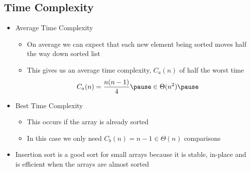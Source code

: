 \begin{slide}
\section[-1]{Time Complexity}

\begin{PauseHighLight}
  \begin{itemize}
  \item Average Time Complexity\pause
    \begin{itemize}
    \item On average we can expect that each new element being sorted
      moves half the way down sorted list\pause
    \item This gives us an average time complexity, $C_a(n)$ of half the
      worst time
      \begin{align*}
        C_a(n) = \frac{n(n-1)}{4}\pause\in \Theta(n^2)\pause
      \end{align*}
    \end{itemize}
  \item Best Time Complexity\pause
    \begin{itemize}
    \item This occurs if the array is already sorted\pause
    \item In this case we only need $C_b(n)=n-1\in \Theta(n)$
      comparisons\pause
    \end{itemize}
  \item Insertion sort is a good sort for small arrays because it is
    stable, in-place and is efficient when the arrays are almost sorted\pause
  \end{itemize}
\end{PauseHighLight}

\end{slide}



